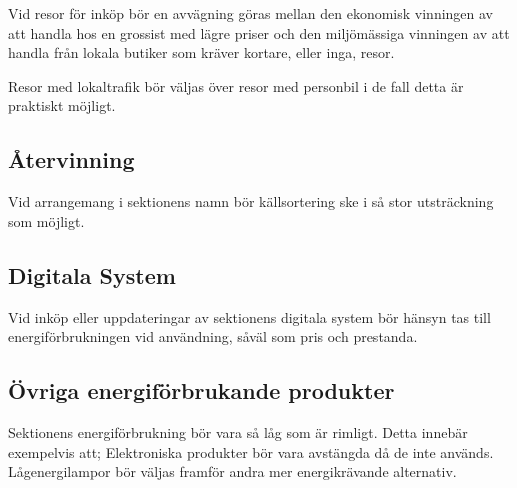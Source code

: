\documentclass[11pt, includeaddress]{classes/cthit}
\begin{document}
Vid resor för inköp bör en avvägning göras mellan den ekonomisk vinningen av att handla hos en
grossist med lägre priser och den miljömässiga vinningen av att handla från lokala butiker som
kräver kortare, eller inga, resor.

Resor med lokaltrafik bör väljas över resor med personbil i de fall detta är praktiskt möjligt.

\subsection{Återvinning}
Vid arrangemang i sektionens namn bör källsortering ske i så stor utsträckning som möjligt.

\subsection{Digitala System}
Vid inköp eller uppdateringar av sektionens digitala system bör hänsyn tas till
energiförbrukningen vid användning, såväl som pris och prestanda.

\subsection{Övriga energiförbrukande produkter}
Sektionens energiförbrukning bör vara så låg som är rimligt. Detta innebär exempelvis att;
Elektroniska produkter bör vara avstängda då de inte används.
Lågenergilampor bör väljas framför andra mer energikrävande alternativ.
\end{document}
